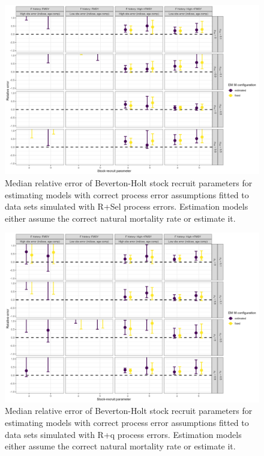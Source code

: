 \documentclass[
  12pt,
]{article}
\begin{document}
\begin{landscape}
\begin{figure}
\caption{Median relative error of Beverton-Holt stock recruit parameters for estimating models with correct process error assumptions fitted to data sets simulated with R+Sel process errors. Estimation models either assume the correct natural mortality rate or estimate it.}\label{Sel_om_SR_relbias}
\begin{center}
\includegraphics[width = \textwidth]{Sel_om_SR_relerror.png}
\end{center}
\end{figure}
\end{landscape}

\begin{landscape}
\begin{figure}
\caption{Median relative error of Beverton-Holt stock recruit parameters for estimating models with correct process error assumptions fitted to data sets simulated with R+q process errors. Estimation models either assume the correct natural mortality rate or estimate it.}\label{q_om_SR_relbias}
\begin{center}
\includegraphics[width = \textwidth]{q_om_SR_relerror.png}
\end{center}
\end{figure}
\end{landscape}
\end{document}
